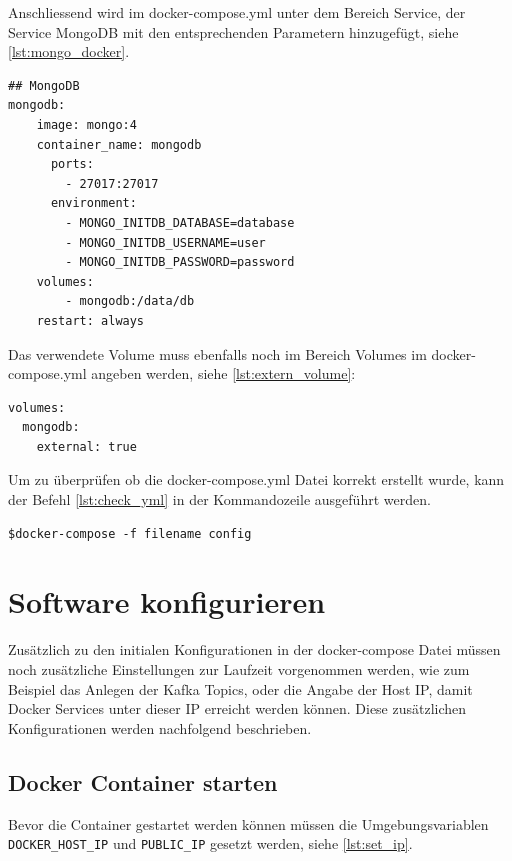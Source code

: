 Anschliessend wird im docker-compose.yml unter dem Bereich Service, der Service MongoDB mit den entsprechenden Parametern hinzugef{\"u}gt, siehe \ref{lst:mongo_docker}.

\begin{lstlisting}[float=h,frame=tb,caption={Auszug docker-compose.yml MongoDB},label=lst:mongo_docker]
## MongoDB
mongodb:
    image: mongo:4
    container_name: mongodb
      ports:
        - 27017:27017
      environment:
        - MONGO_INITDB_DATABASE=database
        - MONGO_INITDB_USERNAME=user
        - MONGO_INITDB_PASSWORD=password
    volumes:
        - mongodb:/data/db
    restart: always
\end{lstlisting}  

Das verwendete Volume muss ebenfalls noch im Bereich Volumes im docker-compose.yml angeben werden, siehe \ref{lst:extern_volume}:
\begin{lstlisting}[float=h,frame=tb,caption={Auszug docker-compose.yml zum Volume erxtern},label=lst:extern_volume]
volumes:
  mongodb:
    external: true
\end{lstlisting}  

Um zu {\"u}berpr{\"u}fen ob die docker-compose.yml Datei korrekt erstellt wurde, kann der Befehl \ref{lst:check_yml} in der Kommandozeile ausgef{\"u}hrt werden. 

\begin{lstlisting}[float=h,frame=tb,caption={Befehl um .yml auf Korrektheit zu pr{\"u}fen},label=lst:check_yml]
		$docker-compose -f filename config
\end{lstlisting}

\section{Software konfigurieren}
\label{sec:tool_konfigurieren}
Zus{\"a}tzlich zu den initialen Konfigurationen in der docker-compose Datei m{\"u}ssen noch zus{\"a}tzliche Einstellungen zur Laufzeit vorgenommen werden, wie zum Beispiel das Anlegen der Kafka Topics, oder die Angabe der Host IP, damit Docker Services unter dieser  IP erreicht werden k{\"o}nnen. Diese zus{\"a}tzlichen Konfigurationen werden nachfolgend beschrieben.

\subsection{Docker Container starten}
Bevor die Container gestartet werden k{\"o}nnen m{\"u}ssen die Umgebungsvariablen \texttt{DOCKER\_HOST\_IP} und \texttt{PUBLIC\_IP} gesetzt werden, siehe \ref{lst:set_ip}. 

